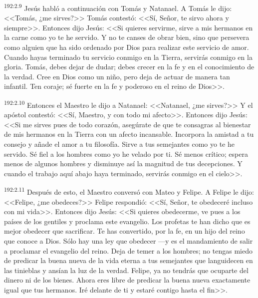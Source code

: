 \par 
\textsuperscript{192:2.9} Jesús habló a continuación con Tomás y Natanael. A Tomás le dijo: <<Tomás, ¿me sirves?>> Tomás contestó: <<Sí, Señor, te sirvo ahora y siempre>>. Entonces dijo Jesús: <<Si quieres servirme, sirve a mis hermanos en la carne como yo te he servido. Y no te canses de obrar bien, sino que persevera como alguien que ha sido ordenado por Dios para realizar este servicio de amor. Cuando hayas terminado tu servicio conmigo en la Tierra, servirás conmigo en la gloria. Tomás, debes dejar de dudar; debes crecer en la fe y en el conocimiento de la verdad. Cree en Dios como un niño, pero deja de actuar de manera tan infantil. Ten coraje; sé fuerte en la fe y poderoso en el reino de Dios>>.

\par 
\textsuperscript{192:2.10} Entonces el Maestro le dijo a Natanael: <<Natanael, ¿me sirves?>> Y el apóstol contestó: <<Sí, Maestro, y con todo mi afecto>>. Entonces dijo Jesús: <<Si me sirves pues de todo corazón, asegúrate de que te consagras al bienestar de mis hermanos en la Tierra con un afecto incansable. Incorpora la amistad a tu consejo y añade el amor a tu filosofía. Sirve a tus semejantes como yo te he servido. Sé fiel a los hombres como yo he velado por ti. Sé menos crítico; espera menos de algunos hombres y disminuye así la magnitud de tus decepciones. Y cuando el trabajo aquí abajo haya terminado, servirás conmigo en el cielo>>.

\par 
\textsuperscript{192:2.11} Después de esto, el Maestro conversó con Mateo y Felipe. A Felipe le dijo: <<Felipe, ¿me obedeces?>> Felipe respondió: <<Sí, Señor, te obedeceré incluso con mi vida>>. Entonces dijo Jesús: <<Si quieres obedecerme, ve pues a los países de los gentiles y proclama este evangelio. Los profetas te han dicho que es mejor obedecer que sacrificar. Te has convertido, por la fe, en un hijo del reino que conoce a Dios. Sólo hay una ley que obedecer ---y es el mandamiento de salir a proclamar el evangelio del reino. Deja de temer a los hombres; no tengas miedo de predicar la buena nueva de la vida eterna a tus semejantes que languidecen en las tinieblas y ansían la luz de la verdad. Felipe, ya no tendrás que ocuparte del dinero ni de los bienes. Ahora eres libre de predicar la buena nueva exactamente igual que tus hermanos. Iré delante de ti y estaré contigo hasta el fin>>.

